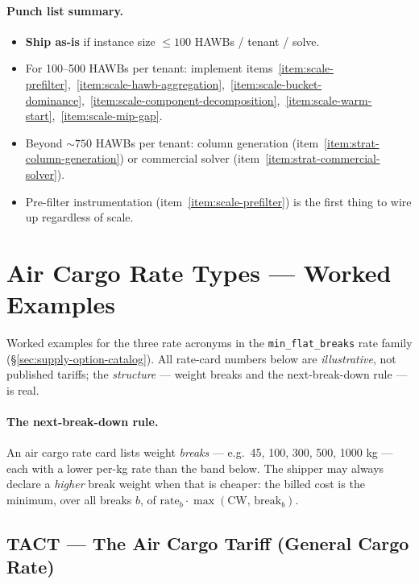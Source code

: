 \documentclass[11pt,a4paper]{article}
\theoremstyle{definition}
\begin{document}
\paragraph{Punch list summary.}
\begin{itemize}[noitemsep]
  \item \textbf{Ship as-is} if instance size $\leq 100$ HAWBs / tenant /
        solve.
  \item For 100--500 HAWBs per tenant: implement
        items~\ref{item:scale-prefilter},~\ref{item:scale-hawb-aggregation},~\ref{item:scale-bucket-dominance},~\ref{item:scale-component-decomposition},~\ref{item:scale-warm-start},~\ref{item:scale-mip-gap}.
  \item Beyond $\sim 750$ HAWBs per tenant: column generation
        (item~\ref{item:strat-column-generation}) or commercial solver
        (item~\ref{item:strat-commercial-solver}).
  \item Pre-filter instrumentation (item~\ref{item:scale-prefilter}) is the
        first thing to wire up regardless of scale.
\end{itemize}

\appendix

\section{Air Cargo Rate Types --- Worked Examples}
\label{sec:appendix-rate-examples}

Worked examples for the three rate acronyms in the \texttt{min\_flat\_breaks}
rate family (\S\ref{sec:supply-option-catalog}). All rate-card numbers below
are \emph{illustrative}, not published tariffs; the \emph{structure} --- weight
breaks and the next-break-down rule --- is real.

\paragraph{The next-break-down rule.}
An air cargo rate card lists weight \emph{breaks} --- e.g.\ 45, 100, 300, 500,
1000 kg --- each with a lower per-kg rate than the band below. The shipper
may always declare a \emph{higher} break weight when that is cheaper: the
billed cost is the minimum, over all breaks $b$, of $\text{rate}_b \cdot
\max(\text{CW},\, \text{break}_b)$.

\subsection{TACT --- The Air Cargo Tariff (General Cargo Rate)}
\label{sec:appendix-tact}
\end{document}
